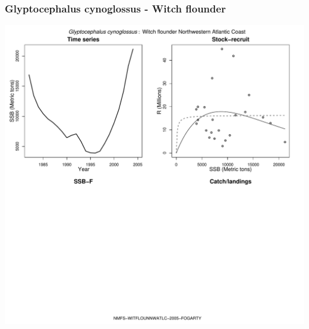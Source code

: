 \subsubsection{Glyptocephalus cynoglossus - Witch flounder}
\begin{center}
\includegraphics[width=1.2\textwidth]{../R/figures/NMFS-WITFLOUNNWATLC-2005-FOGARTY.pdf}
\end{center}

